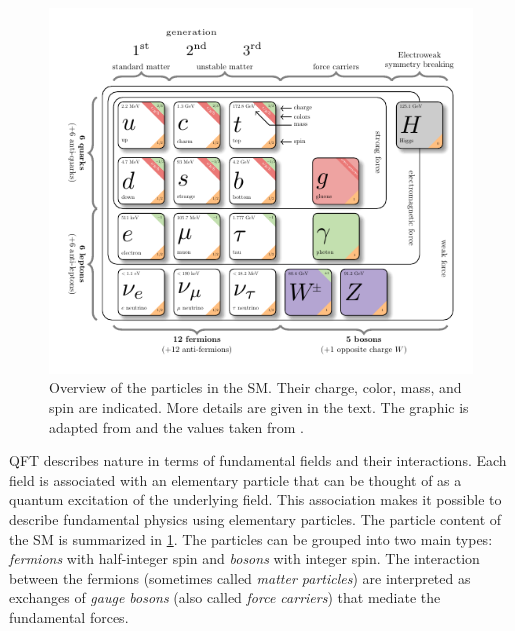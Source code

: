 \begin{figure}
  \includegraphics[width=1\textwidth,trim=10 0 10 0]{figures/theory/particles-infographic/particles-infographic.pdf}
  \caption[Overview of particles in the SM.]{Overview of the particles in the SM. Their charge, color, mass, and spin are indicated. More details are given in the text. The graphic is adapted from  and the values taken from .}  
  \label{fig:particles-infographic}
\end{figure}
QFT describes nature in terms of fundamental fields and their interactions. Each field is associated with an elementary particle that can be thought of as a quantum excitation of the underlying field. 
This association makes it possible to describe fundamental physics using elementary particles.
The particle content of the SM is summarized in \cref{fig:particles-infographic}. The particles can be grouped into two main types: 
\emph{fermions} with half-integer spin and \emph{bosons} with integer spin. The interaction between the fermions (sometimes called \emph{matter particles}) are interpreted as exchanges of \emph{gauge bosons} (also called \emph{force carriers}) that mediate the fundamental forces. 

